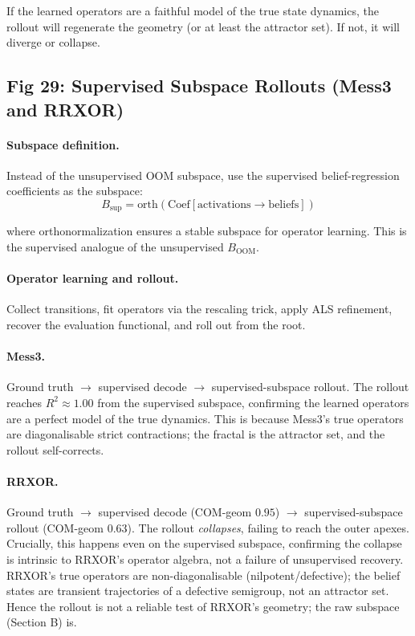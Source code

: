 \documentclass[11pt]{article}
\begin{document}
If the learned operators are a faithful model of the true state dynamics, the rollout will regenerate the geometry (or at least the attractor set). If not, it will diverge or collapse.

\subsection{Fig 29: Supervised Subspace Rollouts (Mess3 and RRXOR)}

\paragraph{Subspace definition.}

Instead of the unsupervised OOM subspace, use the supervised belief-regression coefficients as the subspace:
\begin{equation}
B_{\text{sup}} = \text{orth}(\text{Coef}[\text{activations} \to \text{beliefs}])
\end{equation}

where orthonormalization ensures a stable subspace for operator learning. This is the supervised analogue of the unsupervised $B_{\text{OOM}}$.

\paragraph{Operator learning and rollout.}

Collect transitions, fit operators via the rescaling trick, apply ALS refinement, recover the evaluation functional, and roll out from the root.

\paragraph{Mess3.}

Ground truth $\to$ supervised decode $\to$ supervised-subspace rollout. The rollout reaches $R^2 \approx 1.00$ from the supervised subspace, confirming the learned operators are a perfect model of the true dynamics. This is because Mess3's true operators are diagonalisable strict contractions; the fractal is the attractor set, and the rollout self-corrects.

\paragraph{RRXOR.}

Ground truth $\to$ supervised decode (COM-geom $0.95$) $\to$ supervised-subspace rollout (COM-geom $0.63$). The rollout \textit{collapses}, failing to reach the outer apexes. Crucially, this happens even on the supervised subspace, confirming the collapse is intrinsic to RRXOR's operator algebra, not a failure of unsupervised recovery. RRXOR's true operators are non-diagonalisable (nilpotent/defective); the belief states are transient trajectories of a defective semigroup, not an attractor set. Hence the rollout is not a reliable test of RRXOR's geometry; the raw subspace (Section B) is.
\end{document}
